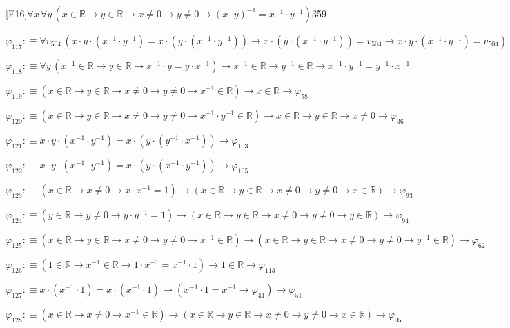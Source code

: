 \begin{fullproof}{[E16]}{$\forall x\,\forall y\,(x \in \mathbb{R} \to y \in \mathbb{R} \to x \neq 0 \to y \neq 0 \to (x \cdot y)^{-1} = x^{-1} \cdot y^{-1})$}{359}
\begin{abbrevlist}
\item $\varphi_{117} :\equiv \forall v_{504}\,(x \cdot y \cdot (x^{-1} \cdot y^{-1}) = x \cdot (y \cdot (x^{-1} \cdot y^{-1})) \to x \cdot (y \cdot (x^{-1} \cdot y^{-1})) = v_{504} \to x \cdot y \cdot (x^{-1} \cdot y^{-1}) = v_{504})$
\item $\varphi_{118} :\equiv \forall y\,(x^{-1} \in \mathbb{R} \to y \in \mathbb{R} \to x^{-1} \cdot y = y \cdot x^{-1}) \to x^{-1} \in \mathbb{R} \to y^{-1} \in \mathbb{R} \to x^{-1} \cdot y^{-1} = y^{-1} \cdot x^{-1}$
\item $\varphi_{119} :\equiv (x \in \mathbb{R} \to y \in \mathbb{R} \to x \neq 0 \to y \neq 0 \to x^{-1} \in \mathbb{R}) \to x \in \mathbb{R} \to \varphi_{58}$
\item $\varphi_{120} :\equiv (x \in \mathbb{R} \to y \in \mathbb{R} \to x \neq 0 \to y \neq 0 \to x^{-1} \cdot y^{-1} \in \mathbb{R}) \to x \in \mathbb{R} \to y \in \mathbb{R} \to x \neq 0 \to \varphi_{36}$
\item $\varphi_{121} :\equiv x \cdot y \cdot (x^{-1} \cdot y^{-1}) = x \cdot (y \cdot (y^{-1} \cdot x^{-1})) \to \varphi_{103}$
\item $\varphi_{122} :\equiv x \cdot y \cdot (x^{-1} \cdot y^{-1}) = x \cdot (y \cdot (x^{-1} \cdot y^{-1})) \to \varphi_{105}$
\item $\varphi_{123} :\equiv (x \in \mathbb{R} \to x \neq 0 \to x \cdot x^{-1} = 1) \to (x \in \mathbb{R} \to y \in \mathbb{R} \to x \neq 0 \to y \neq 0 \to x \in \mathbb{R}) \to \varphi_{93}$
\item $\varphi_{124} :\equiv (y \in \mathbb{R} \to y \neq 0 \to y \cdot y^{-1} = 1) \to (x \in \mathbb{R} \to y \in \mathbb{R} \to x \neq 0 \to y \neq 0 \to y \in \mathbb{R}) \to \varphi_{94}$
\item $\varphi_{125} :\equiv (x \in \mathbb{R} \to y \in \mathbb{R} \to x \neq 0 \to y \neq 0 \to x^{-1} \in \mathbb{R}) \to (x \in \mathbb{R} \to y \in \mathbb{R} \to x \neq 0 \to y \neq 0 \to y^{-1} \in \mathbb{R}) \to \varphi_{62}$
\item $\varphi_{126} :\equiv (1 \in \mathbb{R} \to x^{-1} \in \mathbb{R} \to 1 \cdot x^{-1} = x^{-1} \cdot 1) \to 1 \in \mathbb{R} \to \varphi_{113}$
\item $\varphi_{127} :\equiv x \cdot (x^{-1} \cdot 1) = x \cdot (x^{-1} \cdot 1) \to (x^{-1} \cdot 1 = x^{-1} \to \varphi_{41}) \to \varphi_{51}$
\item $\varphi_{128} :\equiv (x \in \mathbb{R} \to x \neq 0 \to x^{-1} \in \mathbb{R}) \to (x \in \mathbb{R} \to y \in \mathbb{R} \to x \neq 0 \to y \neq 0 \to x \in \mathbb{R}) \to \varphi_{95}$

\end{abbrevlist}
\end{fullproof}
